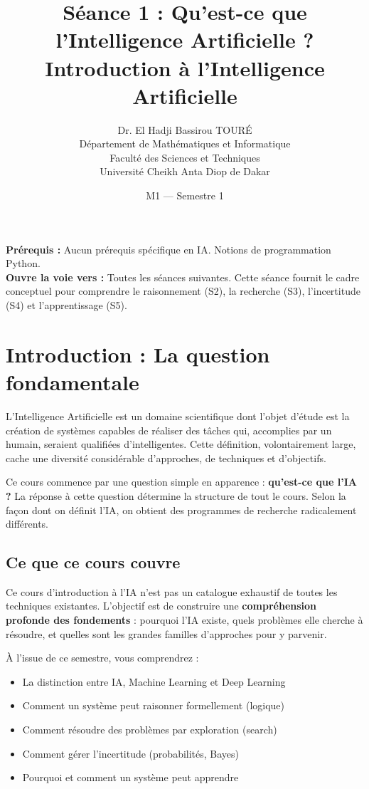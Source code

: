 \documentclass[11pt,a4paper]{article}
\title{\textbf{Séance 1 : Qu'est-ce que l'Intelligence Artificielle ?}\\
\large Introduction à l'Intelligence Artificielle}
\author{Dr. El Hadji Bassirou TOURÉ\\
Département de Mathématiques et Informatique\\
Faculté des Sciences et Techniques\\
Université Cheikh Anta Diop de Dakar}
\date{M1 --- Semestre 1}
\begin{document}
\maketitle

\begin{prereqbox}
\textbf{Prérequis :} Aucun prérequis spécifique en IA. Notions de programmation Python.\\
\textbf{Ouvre la voie vers :} Toutes les séances suivantes. Cette séance fournit le cadre conceptuel pour comprendre le raisonnement (S2), la recherche (S3), l'incertitude (S4) et l'apprentissage (S5).
\end{prereqbox}

\vspace{0.5cm}

\tableofcontents

\newpage

\section{Introduction : La question fondamentale}

L'Intelligence Artificielle est un domaine scientifique dont l'objet d'étude est la création de systèmes capables de réaliser des tâches qui, accomplies par un humain, seraient qualifiées d'intelligentes. Cette définition, volontairement large, cache une diversité considérable d'approches, de techniques et d'objectifs.

Ce cours commence par une question simple en apparence : \textbf{qu'est-ce que l'IA ?} La réponse à cette question détermine la structure de tout le cours. Selon la façon dont on définit l'IA, on obtient des programmes de recherche radicalement différents.

\subsection{Ce que ce cours couvre}

Ce cours d'introduction à l'IA n'est pas un catalogue exhaustif de toutes les techniques existantes. L'objectif est de construire une \textbf{compréhension profonde des fondements} : pourquoi l'IA existe, quels problèmes elle cherche à résoudre, et quelles sont les grandes familles d'approches pour y parvenir.

À l'issue de ce semestre, vous comprendrez :
\begin{itemize}
    \item La distinction entre IA, Machine Learning et Deep Learning
    \item Comment un système peut raisonner formellement (logique)
    \item Comment résoudre des problèmes par exploration (search)
    \item Comment gérer l'incertitude (probabilités, Bayes)
    \item Pourquoi et comment un système peut apprendre
\end{itemize}
\end{document}
